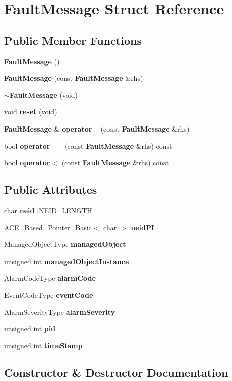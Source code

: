 \section{Fault\+Message Struct Reference}
\label{structFaultMessage}
\subsection*{Public Member Functions}
\begin{DoxyCompactItemize}
\item 
{\bf Fault\+Message} ()
\item 
{\bf Fault\+Message} (const {\bf Fault\+Message} \&rhs)
\item 
{\bf $\sim$\+Fault\+Message} (void)
\item 
void {\bf reset} (void)
\item 
{\bf Fault\+Message} \& {\bf operator=} (const {\bf Fault\+Message} \&rhs)
\item 
bool {\bf operator==} (const {\bf Fault\+Message} \&rhs) const 
\item 
bool {\bf operator$<$} (const {\bf Fault\+Message} \&rhs) const 
\end{DoxyCompactItemize}
\subsection*{Public Attributes}
\begin{DoxyCompactItemize}
\item 
char {\bf neid} [N\+E\+I\+D\+\_\+\+L\+E\+N\+G\+TH]
\item 
A\+C\+E\+\_\+\+Based\+\_\+\+Pointer\+\_\+\+Basic$<$ char $>$ {\bf neid\+PI}
\item 
Managed\+Object\+Type {\bf managed\+Object}
\item 
unsigned int {\bf managed\+Object\+Instance}
\item 
Alarm\+Code\+Type {\bf alarm\+Code}
\item 
Event\+Code\+Type {\bf event\+Code}
\item 
Alarm\+Severity\+Type {\bf alarm\+Severity}
\item 
unsigned int {\bf pid}
\item 
unsigned int {\bf time\+Stamp}
\end{DoxyCompactItemize}


\subsection{Constructor \& Destructor Documentation}
